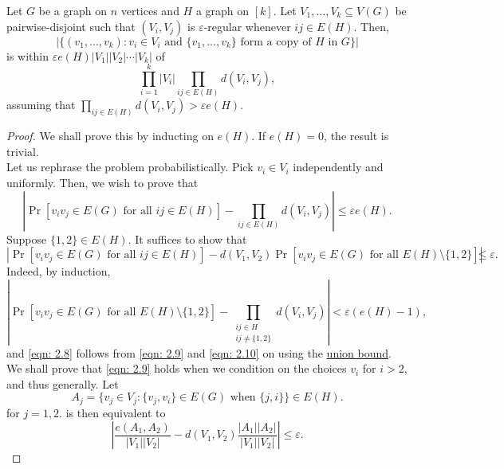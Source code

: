			\begin{ftheo}
				Let $G$ be a graph on $n$ vertices and $H$ a graph on $[k]$. Let $V_1,\ldots,V_k\subseteq V(G)$ be pairwise-disjoint such that $(V_i,V_j)$ is $\varepsilon$-regular whenever $ij\in E(H)$. Then,
				\[ \left|\{(v_1,\ldots,v_k) : v_i \in V_i \text{ and } \{v_1,\ldots,v_k\} \text{ form a copy of $H$ in $G$}\}\right| \]
				is within $\varepsilon e(H)|V_1||V_2|\cdots|V_k|$ of
				\[ \prod_{i=1}^k |V_i| \prod_{ij\in E(H)} d(V_i,V_j),  \]
				assuming that $\prod_{ij\in E(H)} d(V_i,V_j) > \varepsilon e(H)$.
			\end{ftheo}

			\begin{proof}
				We shall prove this by inducting on $e(H)$. If $e(H)=0$, the result is trivial.\\
				Let us rephrase the problem probabilistically. Pick $v_i\in V_i$ independently and uniformly. Then, we wish to prove that
				\begin{equation}
					\label{eqn: 2.8}
					\left|\Pr\left[ v_iv_j\in E(G) \text{ for all } ij\in E(H) \right] - \prod_{ij\in E(H)} d(V_i,V_j)\right| \le \varepsilon e(H).
				\end{equation}
				Suppose $\{1,2\}\in E(H)$. It suffices to show that
				\begin{equation}
					\label{eqn: 2.9}
					\left| \Pr\left[ v_iv_j \in E(G) \text{ for all }ij\in E(H) \right] - d(V_1,V_2) \Pr\left[ v_iv_j\in E(G) \text{ for all }E(H)\setminus\{1,2\} \right] \right| \le \varepsilon.
				\end{equation}
				Indeed, by induction,
				\begin{equation}
					\label{eqn: 2.10}
					\left| \Pr\left[ v_iv_j\in E(G) \text{ for all }E(H)\setminus\{1,2\} \right] - \prod_{\substack{ij\in H \\ ij\neq\{1,2\}}} d(V_i,V_j) \right| < \varepsilon(e(H) - 1),
				\end{equation}
				and \eqref{eqn: 2.8} follows from \eqref{eqn: 2.9} and \eqref{eqn: 2.10} on using the \href{https://en.wikipedia.org/wiki/Boole%27s_inequality}{union bound}. We shall prove that \eqref{eqn: 2.9} holds when we condition on the choices $v_i$ for $i>2$, and thus generally. Let
				\[ A_j = \{ v_j \in V_j : \{v_j,v_i\} \in E(G) \text{ when } \{j,i\} \}\in E(H). \]
				for $j = 1,2$.  is then equivalent to
				\begin{equation}
					\label{eqn: 2.11}
					\left| \frac{e(A_1,A_2)}{|V_1||V_2|} - d(V_1,V_2) \frac{|A_1||A_2|}{|V_1||V_2|} \right| \le \varepsilon.

\end{equation}
\end{proof}
